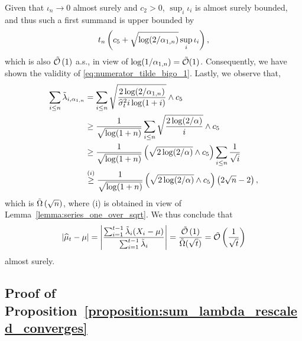 Given that $\iota_n \to 0$ almost surely and $c_2 > 0$, $\sup_i \iota_i$ is almost surely bounded, and thus such a first summand is upper bounded by
\begin{align*}
    t_n \left( c_5 + \sqrt{\log (2 / \alpha_{1, n})} \sup_i \iota_i \right),
\end{align*}
which is also $\tilde{\mathcal{O}}\left( 1 \right)$ a.s., in view of $\log (1 / \alpha_{1, n}) = \tilde{\mathcal{O}}(1)$. Consequently, we have shown the validity of \eqref{eq:numerator_tilde_bigo_1}. Lastly, we observe that,
\begin{align*}
    \sum_{i \leq n}  \tilde \lambda_{i, \alpha_{1, n}} &= \sum_{i \leq n} \sqrt\frac{2\log(2/\alpha_{1, n})}{\widehat \sigma_{t}^2 i \log (1+i)} \wedge c_5
    \\&\geq \frac{1}{\sqrt {\log (1+n)}} \sum_{i \leq n} \sqrt\frac{2\log(2/\alpha)}{ i } \wedge c_5
    \\&\geq \frac{1}{\sqrt {\log (1+n)}} \left( \sqrt{2\log(2/\alpha)} \wedge c_5 \right) \sum_{i \leq n} \frac{1}{ \sqrt i }
    \\&\stackrel{(i)}{\geq} \frac{1}{\sqrt {\log (1+n)}} \left( \sqrt{2\log(2/\alpha)} \wedge c_5 \right) \left( 2\sqrt{n} - 2\right),
\end{align*}
which is $\tilde\Omega\left( \sqrt{n}\right)$,
where (i) is obtained in view of Lemma~\ref{lemma:series_one_over_sqrt}. We thus conclude that
\begin{align*}
    \left| \widehat\mu_t - \mu \right|  = \left| \frac{\sum_{i=1}^{t-1} \tilde \lambda_i (X_i-\mu)}{\sum_{i=1}^{t-1} \tilde \lambda_i} \right| = \frac{\tilde {\mathcal{O}} \left( 1\right)}{\tilde \Omega(\sqrt{t})} = \tilde {\mathcal{O}} \left( \frac{1}{\sqrt t}\right)
\end{align*}
almost surely. 



\subsection{Proof of Proposition~\ref{proposition:sum_lambda_rescaled_converges}} \label{proof:sum_lambda_rescaled_converges}

